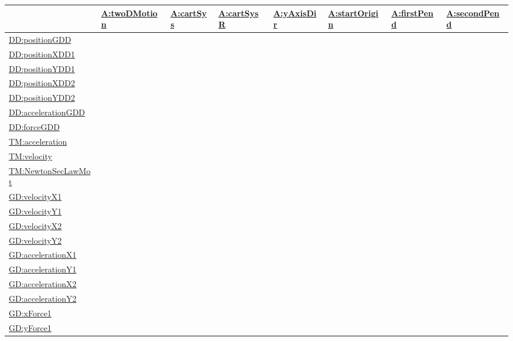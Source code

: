 \documentclass[12pt]{article}
\begin{document}
\begin{longtable}{l l l l l l l l}
\toprule
\textbf{} & \textbf{\hyperref[twoDMotion]{A:twoDMotion}} & \textbf{\hyperref[cartSys]{A:cartSys}} & \textbf{\hyperref[cartSysR]{A:cartSysR}} & \textbf{\hyperref[yAxisDir]{A:yAxisDir}} & \textbf{\hyperref[startOrigin]{A:startOrigin}} & \textbf{\hyperref[firstPend]{A:firstPend}} & \textbf{\hyperref[secondPend]{A:secondPend}}
\\
\midrule
\endhead
\hyperref[DD:positionGDD]{DD:positionGDD} &  &  &  &  &  &  & 
\\
\hyperref[DD:positionXDD1]{DD:positionXDD1} &  &  &  &  &  &  & 
\\
\hyperref[DD:positionYDD1]{DD:positionYDD1} &  &  &  &  &  &  & 
\\
\hyperref[DD:positionXDD2]{DD:positionXDD2} &  &  &  &  &  &  & 
\\
\hyperref[DD:positionYDD2]{DD:positionYDD2} &  &  &  &  &  &  & 
\\
\hyperref[DD:accelerationGDD]{DD:accelerationGDD} &  &  &  &  &  &  & 
\\
\hyperref[DD:forceGDD]{DD:forceGDD} &  &  &  &  &  &  & 
\\
\hyperref[TM:acceleration]{TM:acceleration} &  &  &  &  &  &  & 
\\
\hyperref[TM:velocity]{TM:velocity} &  &  &  &  &  &  & 
\\
\hyperref[TM:NewtonSecLawMot]{TM:NewtonSecLawMot} &  &  &  &  &  &  & 
\\
\hyperref[GD:velocityX1]{GD:velocityX1} &  &  &  &  &  &  & 
\\
\hyperref[GD:velocityY1]{GD:velocityY1} &  &  &  &  &  &  & 
\\
\hyperref[GD:velocityX2]{GD:velocityX2} &  &  &  &  &  &  & 
\\
\hyperref[GD:velocityY2]{GD:velocityY2} &  &  &  &  &  &  & 
\\
\hyperref[GD:accelerationX1]{GD:accelerationX1} &  &  &  &  &  &  & 
\\
\hyperref[GD:accelerationY1]{GD:accelerationY1} &  &  &  &  &  &  & 
\\
\hyperref[GD:accelerationX2]{GD:accelerationX2} &  &  &  &  &  &  & 
\\
\hyperref[GD:accelerationY2]{GD:accelerationY2} &  &  &  &  &  &  & 
\\
\hyperref[GD:xForce1]{GD:xForce1} &  &  &  &  &  &  & 
\\
\hyperref[GD:yForce1]{GD:yForce1} &  &  &  &  &  &  & 
\\

\end{longtable}
\end{document}
